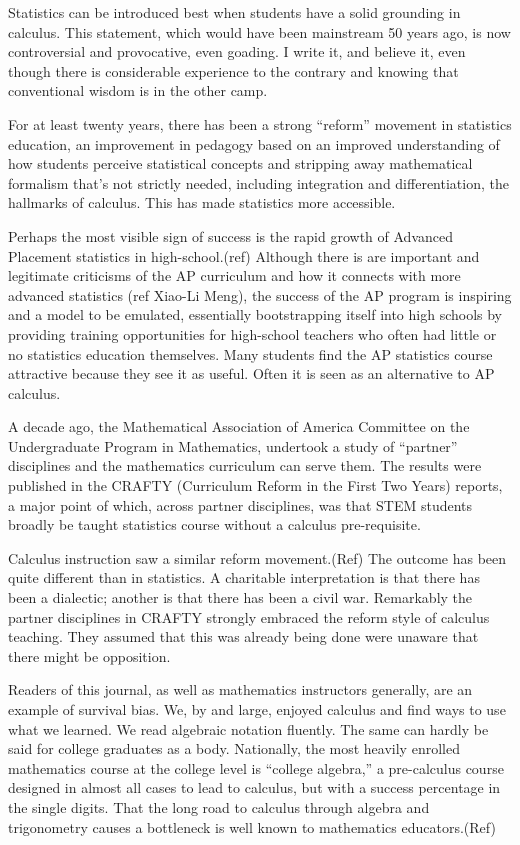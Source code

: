 Statistics can be introduced best when students have a solid grounding in calculus.  This statement, which would have been mainstream 50 years ago, is now controversial and provocative, even goading.  I write it, and believe it, even though there is considerable experience to the contrary and knowing that conventional wisdom is in the other camp.

For at least twenty years, there has been a strong ``reform'' movement in statistics education, an improvement in pedagogy based on an improved understanding of how students perceive statistical concepts and stripping away mathematical formalism that's not strictly needed, including integration and differentiation, the hallmarks of calculus.  This has made statistics more accessible.  

Perhaps the most visible sign of success is the rapid growth of Advanced Placement statistics in high-school.(ref)  Although there is are important and legitimate criticisms of the AP curriculum and how it connects with more advanced statistics (ref Xiao-Li Meng), the success of the AP program is inspiring and a model to be emulated, essentially bootstrapping itself into high schools by providing training opportunities for high-school teachers who often had little or no statistics education themselves.  Many students find the AP statistics course attractive because they see it as useful.  Often it is seen as an alternative to AP calculus.  

A decade ago, the Mathematical Association of America Committee on the Undergraduate Program in Mathematics, undertook a study of ``partner'' disciplines and the mathematics curriculum can serve them.  The results were published in the CRAFTY (Curriculum Reform in the First Two Years) reports, a major point of which, across partner disciplines, was that STEM students broadly be taught statistics course without a calculus pre-requisite.

Calculus instruction saw a similar reform movement.(Ref)  The outcome has been quite different than in statistics.  A charitable interpretation is that there has been a dialectic; another is that there has been a civil war. Remarkably the partner disciplines in CRAFTY strongly embraced the reform style of calculus teaching.  They assumed that this was already being done were unaware that there might be opposition.

Readers of this journal, as well as mathematics instructors generally, are an example of survival bias.  We, by and large, enjoyed calculus and find ways to use what we learned.  We read algebraic notation fluently.  The same can hardly be said for college graduates as a body.  Nationally, the most heavily enrolled mathematics course at the college level is ``college algebra,'' a pre-calculus course designed in almost all cases to lead to calculus, but with a success percentage in the single digits. That the long road to calculus through algebra and trigonometry causes a bottleneck is well known to mathematics educators.(Ref)

